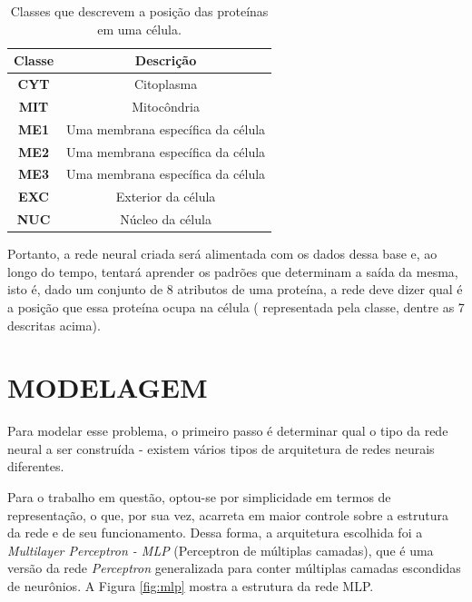 \documentclass[12pt]{article}
\begin{document}
\begin{table}[h]
	\centering
	\begin{tabular}{|c|c|}
		\hline
		\textbf{Classe} & \textbf{Descrição} \\ \hline
		\textbf{CYT} & Citoplasma \\ \hline
		\textbf{MIT} & Mitocôndria \\ \hline
		\textbf{ME1} & Uma membrana específica da célula \\ \hline
		\textbf{ME2} & Uma membrana específica da célula \\ \hline
		\textbf{ME3} & Uma membrana específica da célula \\ \hline
		\textbf{EXC} & Exterior da célula \\ \hline
		\textbf{NUC} & Núcleo da célula \\ \hline
	\end{tabular}
	\caption{\label{tab:classes} Classes que descrevem a posição
	das proteínas em uma célula.}
\end{table}

Portanto, a rede neural criada será alimentada com os dados dessa base e,
ao longo do tempo, tentará aprender os padrões que determinam a saída
da mesma, isto é, dado um conjunto de 8 atributos de uma proteína, a
rede deve dizer qual é a posição que essa proteína ocupa na célula (
representada pela classe, dentre as 7 descritas acima).

\section{MODELAGEM}

Para modelar esse problema, o primeiro passo é determinar qual o tipo
da rede neural a ser construída - existem vários tipos de arquitetura
de redes neurais diferentes.

Para o trabalho em questão, optou-se por simplicidade em termos de
representação, o que, por sua vez, acarreta em maior controle sobre 
a estrutura da rede e de seu funcionamento. Dessa forma, a arquitetura
escolhida foi a \textit{Multilayer Perceptron - MLP} (Perceptron de
múltiplas camadas), que é uma versão da rede \textit{Perceptron} 
generalizada para conter múltiplas camadas escondidas de neurônios.
A Figura \ref{fig:mlp} mostra a estrutura da rede MLP.
\end{document}
